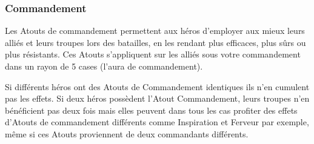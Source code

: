 \newpage
\subsubsection{Commandement}
Les Atouts de commandement permettent aux héros d’employer aux mieux leurs alliés et leurs troupes lors des batailles, en les rendant plus efficaces, plus sûrs ou plus résistants. Ces Atouts s’appliquent sur les alliés sous votre commandement dans un rayon de 5 cases (l’aura de commandement). 

Si différents héros ont des Atouts de Commandement identiques ils n’en cumulent pas les effets. Si deux héros possèdent l’Atout Commandement, leurs troupes n’en bénéficient pas deux fois mais elles peuvent dans tous les cas profiter des effets d’Atouts de commandement différents comme Inspiration et Ferveur par exemple, même si ces Atouts proviennent de deux commandants différents.


